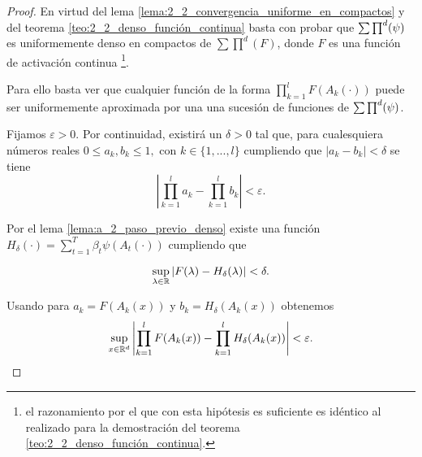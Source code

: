 \begin{proof}
    En virtud del lema \ref{lema:2_2_convergencia_uniforme_en_compactos} y del 
    teorema \ref{teo:2_2_denso_función_continua} basta con probar que 
    $\sum \prod^d (\psi)$ es uniformemente denso en compactos de $\sum \prod^d(F)$, 
    donde $F$ es una función de activación continua 
    \footnote{el razonamiento 
    por el que con esta hipótesis es suficiente es idéntico al realizado para la 
    demostración del teorema \ref{teo:2_2_denso_función_continua}.}.

    Para ello basta ver que cualquier función de la forma $\prod_{k=1}^l F(A_k(\cdot))$
    puede ser uniformemente aproximada por una una sucesión de funciones de $\sum \prod^d (\psi)$.

    Fijamos $\varepsilon > 0$. 
    Por continuidad, existirá un $\delta >0$
    tal que, para cualesquiera números reales $0 \leq a_k, b_k \leq 1,$ con $k \in \{1,...,l\}$ 
    cumpliendo que $|a_k -b_k| < \delta$ se tiene
    \begin{equation} \label{eq:teorema_2_3__1}
        \left| 
            \prod^l_{k=1} a_k - \prod^l_{k=1} b_k 
        \right| 
        < 
        \varepsilon.
    \end{equation}

    Por el lema \ref{lema:a_2_paso_previo_denso} existe una función 
    $H_{\delta}(\cdot) = \sum_{t=1}^T \beta_t \psi(A_t(\cdot))$
    cumpliendo que 

    \begin{equation}
        \sup_{\lambda \in \mathbb{R}} |F(\lambda) - H_{\delta}(\lambda) | < \delta.
    \end{equation}

    Usando  para 
    $a_k = F(A_k(x))$ y $b_k = H_\delta(A_k(x))$
    obtenemos
    \begin{equation}\label{eq:teorema2_3__3}
        \sup_{x \in \mathbb{R}^d} 
        \left| 
            \prod ^l_{k=1} F(A_k(x))
            -
            \prod ^l_{k=1} H_\delta(A_k(x))
        \right| 
        < 
        \varepsilon.
    \end{equation} 
    

\end{proof}
